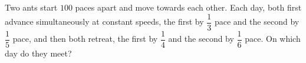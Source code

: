 Two ants start $100$ paces apart and move towards each other. Each day, both first advance simultaneously at constant speeds, the first by $\dfrac13$ pace and the second by $\dfrac15$ pace, and then both retreat, the first by $\dfrac14$ and the second by $\dfrac16$ pace. On which day do they meet?

